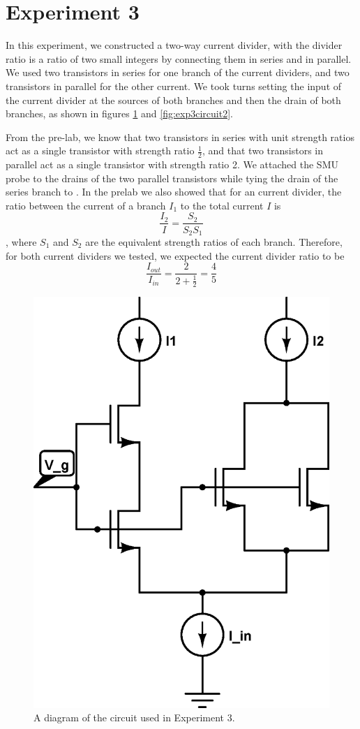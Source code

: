 \section*{Experiment 3}

In this experiment, we constructed a two-way current divider, with the divider ratio is a ratio of
two small integers by connecting them in series and in parallel. We used two \nMOS transistors in series for one branch of the current dividers, and two \nMOS transistors in parallel for the other current. We took turns setting the input of the current divider at the sources of both branches and then the drain of both branches, as shown in figures \ref{fig:exp3p1dia} and \ref{fig:exp3circuit2}.

From the pre-lab, we know that two transistors in series with unit strength ratios act as a single \nMOS transistor with strength ratio $\frac{1}{2}$, and that two \nMOS transistors in parallel act as a single \nMOS transistor with strength ratio 2. We attached the SMU probe to the drains of the two parallel \nMOS transistors while tying the drain of the series \nMOS branch to \Vdd. In the prelab we also showed that for an \nMOS current divider, the ratio between the current of a branch $I_1$ to the total current $I$ is $$\frac{I_2}{I} = \frac{S_2}{S_2S_1}$$, where $S_1$ and $S_2$ are the equivalent strength ratios of each branch. Therefore, for both current dividers we tested, we expected the current divider ratio to be $$\frac{I_{out}}{I_{in}} = \frac{2}{2 + \frac{1}{2}} = \frac{4}{5}$$


\begin{figure}[H]
\centering
\includegraphics[width=0.55\linewidth]{../Figures/Experiment3CircuitDiagram1.eps}
\caption{A diagram of the circuit used in Experiment 3.}
\label{fig:exp3p1dia}
\end{figure}


